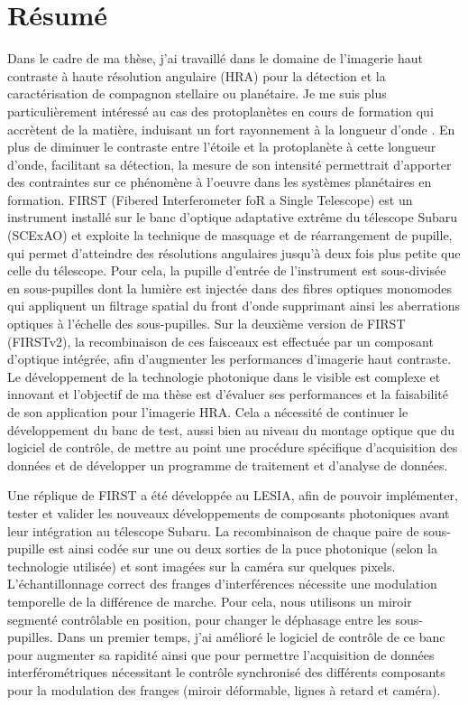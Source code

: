 
\clearpage
\section*{Résumé}

Dans le cadre de ma thèse, j'ai travaillé dans le domaine de l'imagerie haut contraste à haute résolution angulaire (HRA) pour la détection et la caractérisation de compagnon stellaire ou planétaire. Je me suis plus particulièrement intéressé au cas des protoplanètes en cours de formation qui accrètent de la matière, induisant un fort rayonnement à la longueur d'onde \ha. En plus de diminuer le contraste entre l'étoile et la protoplanète à cette longueur d'onde, facilitant sa détection, la mesure de son intensité permettrait d'apporter des contraintes sur ce phénomène à l'oeuvre dans les systèmes planétaires en formation. FIRST (Fibered Interferometer foR a Single Telescope) est un instrument installé sur le banc d'optique adaptative extrême du télescope Subaru (SCExAO) et exploite la technique de masquage et de réarrangement de pupille, qui permet d'atteindre des résolutions angulaires jusqu'à deux fois plus petite que celle du télescope. Pour cela, la pupille d'entrée de l'instrument est sous-divisée en sous-pupilles dont la lumière est injectée dans des fibres optiques monomodes qui appliquent un filtrage spatial du front d'onde supprimant ainsi les aberrations optiques à l'échelle des sous-pupilles. Sur la deuxième version de FIRST (FIRSTv2), la recombinaison de ces faisceaux est effectuée par un composant d'optique intégrée, afin d'augmenter les performances d'imagerie haut contraste. Le développement de la technologie photonique dans le visible est complexe et innovant et l'objectif de ma thèse est d'évaluer ses performances et la faisabilité de son application pour l'imagerie HRA. Cela a nécessité de continuer le développement du banc de test, aussi bien au niveau du montage optique que du logiciel de contrôle, de mettre au point une procédure spécifique d'acquisition des données et de développer un programme de traitement et d'analyse de données.

Une réplique de FIRST a été développée au \ac{LESIA}, afin de pouvoir implémenter, tester et valider les nouveaux développements de composants photoniques avant leur intégration au télescope Subaru. La recombinaison de chaque paire de sous-pupille est ainsi codée sur une ou deux sorties de la puce photonique (selon la technologie utilisée) et sont imagées sur la caméra sur quelques pixels. L'échantillonnage correct des franges d'interférences nécessite une modulation temporelle de la différence de marche. Pour cela, nous utilisons un miroir segmenté contrôlable en position, pour changer le déphasage entre les sous-pupilles. Dans un premier temps, j'ai amélioré le logiciel de contrôle de ce banc pour augmenter sa rapidité ainsi que pour permettre l'acquisition de données interférométriques nécessitant le contrôle synchronisé des différents composants pour la modulation des franges (miroir déformable, lignes à retard et caméra).

